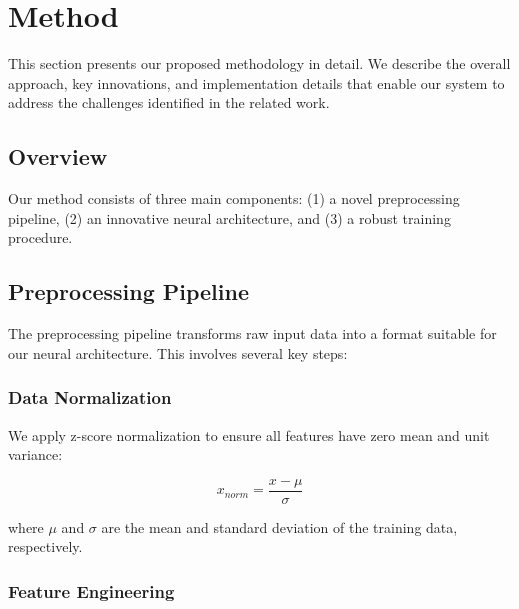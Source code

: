 \section{Method}

This section presents our proposed methodology in detail. We describe the overall approach, key innovations, and implementation details that enable our system to address the challenges identified in the related work.

\subsection{Overview}

Our method consists of three main components: (1) a novel preprocessing pipeline, (2) an innovative neural architecture, and (3) a robust training procedure. %



\subsection{Preprocessing Pipeline}

The preprocessing pipeline transforms raw input data into a format suitable for our neural architecture. This involves several key steps:

\subsubsection{Data Normalization}

We apply z-score normalization to ensure all features have zero mean and unit variance:

\begin{equation}
x_{norm} = \frac{x - \mu}{\sigma}
\end{equation}

where $\mu$ and $\sigma$ are the mean and standard deviation of the training data, respectively.

\subsubsection{Feature Engineering}

